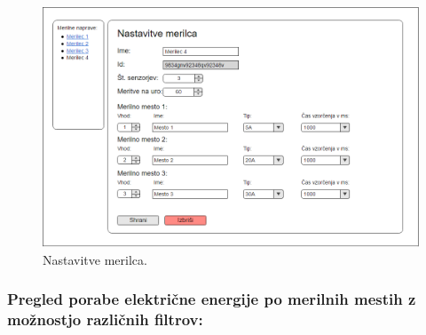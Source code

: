\documentclass[12pt,a4paper,titlepage,openany]{report}
\begin{document}
\begin{figure}[H]
\begin{center}
\includegraphics[width=1\linewidth]{Slike/UrejanjeMerilca.png}
\end{center}
\caption{Nastavitve merilca.}\label{slika:UrejanjeMerilca}
\end{figure}

\subsubsection{Pregled porabe električne energije po merilnih mestih z možnostjo različnih filtrov:}
\end{document}
